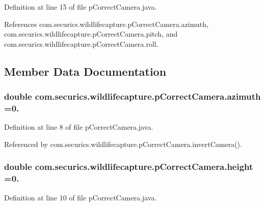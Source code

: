Definition at line 15 of file p\+Correct\+Camera.\+java.



References com.\+securics.\+wildlifecapture.\+p\+Correct\+Camera.\+azimuth, com.\+securics.\+wildlifecapture.\+p\+Correct\+Camera.\+pitch, and com.\+securics.\+wildlifecapture.\+p\+Correct\+Camera.\+roll.



\subsection{Member Data Documentation}
\hypertarget{classcom_1_1securics_1_1wildlifecapture_1_1p_correct_camera_a5452f71e3ba58bc153e969403ba39e92}{
\subsubsection[{azimuth}]{\setlength{\rightskip}{0pt plus 5cm}double com.\+securics.\+wildlifecapture.\+p\+Correct\+Camera.\+azimuth =0.}}\label{classcom_1_1securics_1_1wildlifecapture_1_1p_correct_camera_a5452f71e3ba58bc153e969403ba39e92}


Definition at line 8 of file p\+Correct\+Camera.\+java.



Referenced by com.\+securics.\+wildlifecapture.\+p\+Correct\+Camera.\+invert\+Camera().

\hypertarget{classcom_1_1securics_1_1wildlifecapture_1_1p_correct_camera_a91990a2db593518b18dd200f8a12458c}{
\subsubsection[{height}]{\setlength{\rightskip}{0pt plus 5cm}double com.\+securics.\+wildlifecapture.\+p\+Correct\+Camera.\+height =0.}}\label{classcom_1_1securics_1_1wildlifecapture_1_1p_correct_camera_a91990a2db593518b18dd200f8a12458c}


Definition at line 10 of file p\+Correct\+Camera.\+java.



